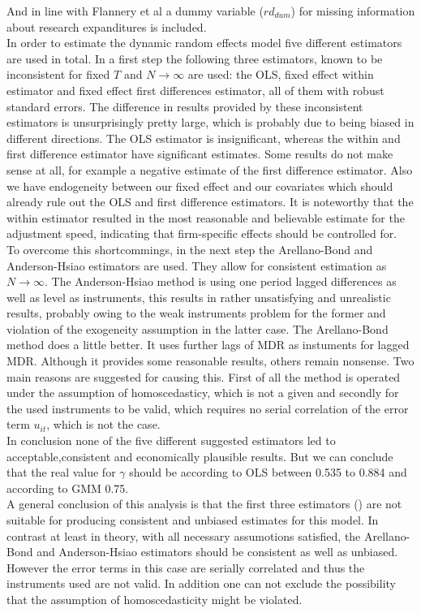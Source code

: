 \documentclass[document.tex]{subfiles}
\begin{document}
And in line with Flannery et al a dummy variable ($rd_{dum}$) for missing information about research expanditures is included.\\
In order to estimate the dynamic random effects model five different estimators are used in total. 
In a first step the following three estimators, known to be inconsistent for fixed $T$ and $N \rightarrow \infty$
are used: the OLS, fixed effect within estimator and fixed effect first differences estimator, all of them with robust standard errors. The difference in results provided by these inconsistent estimators is unsurprisingly pretty large, which is probably due to being biased in different directions.
The OLS estimator is insignificant, whereas the within and first difference estimator have significant estimates.
Some results do not make sense at all, for example a negative estimate of the first difference estimator. Also we have endogeneity between our fixed effect and our covariates which should already rule out the OLS and first difference estimators.
It is noteworthy that the within estimator resulted in the most reasonable and believable estimate for the adjustment speed, indicating that firm-specific effects should be controlled for. \\  
To overcome this shortcommings, in the next step the Arellano-Bond and Anderson-Hsiao estimators are used. They allow for consistent estimation as $N \rightarrow \infty$.
The Anderson-Hsiao method is using one period lagged differences as well as level as instruments, this results in rather unsatisfying and unrealistic results, probably owing to the weak instruments problem for the former and violation of the exogeneity assumption in the latter case. The Arellano-Bond method does a little better. It uses further lags of MDR as instuments  for lagged MDR. Although it provides some reasonable results, others remain nonsense. Two main reasons are suggested for causing this. First of all the method is operated under the assumption of homoscedasticy, which is not a given and secondly for the used instruments to be valid, which requires no serial correlation of the error term $u_{it}$, which is not the case.\\
In conclusion none of the five different suggested estimators led to acceptable,consistent and economically plausible results. But we can conclude that the real value for $\gamma$ should be according to OLS between 0.535 to 0.884 and according to GMM 0.75.\\
A general conclusion of this analysis is that the first three estimators () are not suitable for producing consistent and unbiased estimates for this model. In contrast at least in theory, with all necessary assumotions satisfied, the Arellano-Bond and Anderson-Hsiao estimators should be consistent as well as unbiased. However the error terms in this case are serially correlated and thus the instruments used are not valid. In addition one can not exclude the possibility that the assumption of homoscedasticity might be violated.
\end{document}
